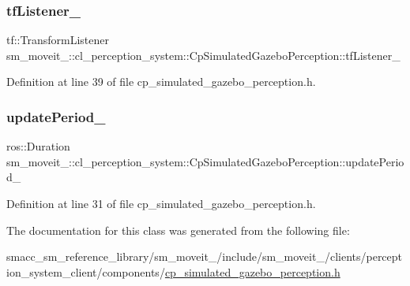 \subsubsection{\texorpdfstring{tf\+Listener\+\_\+}{tfListener\_}}
{\footnotesize\ttfamily tf\+::\+Transform\+Listener sm\+\_\+moveit\+\_\+::cl\+\_\+perception\+\_\+system\+::\+Cp\+Simulated\+Gazebo\+Perception\+::tf\+Listener\+\_\+\hspace{0.3cm}{\ttfamily [private]}}



Definition at line 39 of file cp\+\_\+simulated\+\_\+gazebo\+\_\+perception.\+h.

\mbox{\label{classsm__moveit__4_1_1cl__perception__system_1_1CpSimulatedGazeboPerception_a185c4065558b0c320d73f366bb6b8277}} 
\subsubsection{\texorpdfstring{update\+Period\+\_\+}{updatePeriod\_}}
{\footnotesize\ttfamily ros\+::\+Duration sm\+\_\+moveit\+\_\+::cl\+\_\+perception\+\_\+system\+::\+Cp\+Simulated\+Gazebo\+Perception\+::update\+Period\+\_\+\hspace{0.3cm}{\ttfamily [private]}}



Definition at line 31 of file cp\+\_\+simulated\+\_\+gazebo\+\_\+perception.\+h.



The documentation for this class was generated from the following file\+:\begin{DoxyCompactItemize}
\item 
smacc\+\_\+sm\+\_\+reference\+\_\+library/sm\+\_\+moveit\+\_/include/sm\+\_\+moveit\+\_/clients/perception\+\_\+system\+\_\+client/components/\hyperlink{cp__simulated__gazebo__perception_8h}{cp\+\_\+simulated\+\_\+gazebo\+\_\+perception.\+h}\end{DoxyCompactItemize}
